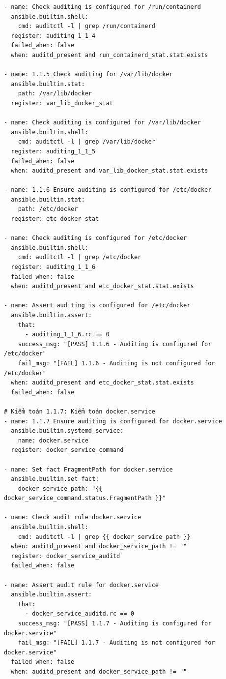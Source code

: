 {\begin{verbatim}
- name: Check auditing is configured for /run/containerd
  ansible.builtin.shell:
    cmd: auditctl -l | grep /run/containerd
  register: auditing_1_1_4
  failed_when: false
  when: auditd_present and run_containerd_stat.stat.exists

- name: 1.1.5 Check auditing for /var/lib/docker
  ansible.builtin.stat:
    path: /var/lib/docker
  register: var_lib_docker_stat

- name: Check auditing is configured for /var/lib/docker
  ansible.builtin.shell:
    cmd: auditctl -l | grep /var/lib/docker
  register: auditing_1_1_5
  failed_when: false
  when: auditd_present and var_lib_docker_stat.stat.exists

- name: 1.1.6 Ensure auditing is configured for /etc/docker
  ansible.builtin.stat:
    path: /etc/docker
  register: etc_docker_stat

- name: Check auditing is configured for /etc/docker
  ansible.builtin.shell:
    cmd: auditctl -l | grep /etc/docker
  register: auditing_1_1_6
  failed_when: false
  when: auditd_present and etc_docker_stat.stat.exists

- name: Assert auditing is configured for /etc/docker
  ansible.builtin.assert:
    that:
      - auditing_1_1_6.rc == 0
    success_msg: "[PASS] 1.1.6 - Auditing is configured for /etc/docker"
    fail_msg: "[FAIL] 1.1.6 - Auditing is not configured for /etc/docker"
  when: auditd_present and etc_docker_stat.stat.exists
  failed_when: false

# Kiểm toán 1.1.7: Kiểm toán docker.service
- name: 1.1.7 Ensure auditing is configured for docker.service
  ansible.builtin.systemd_service:
    name: docker.service
  register: docker_service_command

- name: Set fact FragmentPath for docker.service
  ansible.builtin.set_fact:
    docker_service_path: "{{ docker_service_command.status.FragmentPath }}"

- name: Check audit rule docker.service
  ansible.builtin.shell:
    cmd: auditctl -l | grep {{ docker_service_path }}
  when: auditd_present and docker_service_path != ""
  register: docker_service_auditd
  failed_when: false

- name: Assert audit rule for docker.service
  ansible.builtin.assert:
    that:
      - docker_service_auditd.rc == 0
    success_msg: "[PASS] 1.1.7 - Auditing is configured for docker.service"
    fail_msg: "[FAIL] 1.1.7 - Auditing is not configured for docker.service"
  failed_when: false
  when: auditd_present and docker_service_path != ""


\end{verbatim}}

